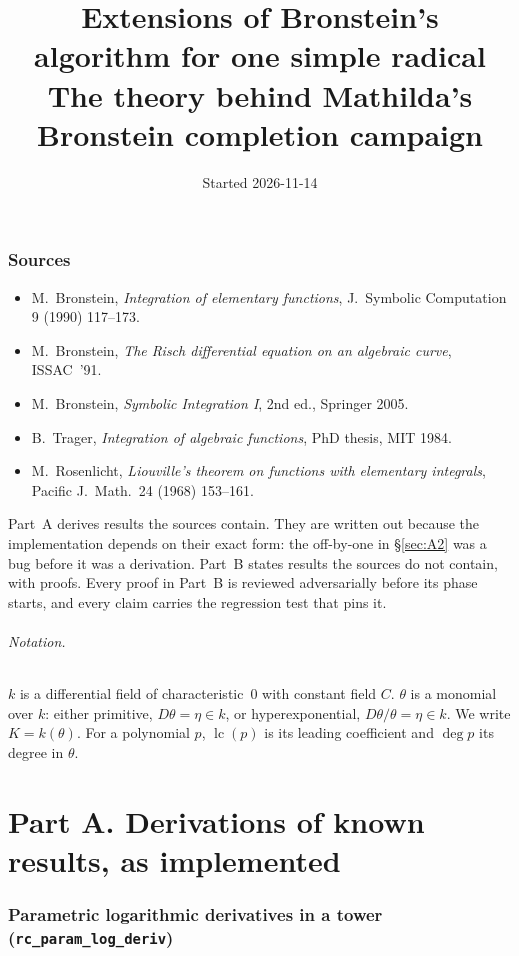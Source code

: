 \documentclass[11pt]{article}
\title{Extensions of Bronstein's algorithm for one simple radical\\
\large The theory behind Mathilda's Bronstein completion campaign}
\date{Started 2026-11-14}
\theoremstyle{definition}
\theoremstyle{remark}
\newcommand{\lc}{\operatorname{lc}}
\newcommand{\code}[1]{\texttt{#1}}
\begin{document}
\maketitle

\section*{Sources}
\begin{itemize}
\item[{[B]}] M.~Bronstein, \emph{Integration of elementary functions}, J.~Symbolic
  Computation 9 (1990) 117--173.
\item[{[B91]}] M.~Bronstein, \emph{The Risch differential equation on an algebraic
  curve}, ISSAC~'91.
\item[{[SI]}] M.~Bronstein, \emph{Symbolic Integration I}, 2nd ed., Springer 2005.
\item[{[T]}] B.~Trager, \emph{Integration of algebraic functions}, PhD thesis, MIT 1984.
\item[{[R]}] M.~Rosenlicht, \emph{Liouville's theorem on functions with elementary
  integrals}, Pacific J.~Math.\ 24 (1968) 153--161.
\end{itemize}

Part~A derives results the sources contain. They are written out because the
implementation depends on their exact form: the off-by-one in
\S\ref{sec:A2} was a bug before it was a derivation. Part~B states results the
sources do not contain, with proofs. Every proof in Part~B is reviewed
adversarially before its phase starts, and every claim carries the regression
test that pins it.

\paragraph{Notation.} $k$ is a differential field of characteristic~0 with
constant field $C$. $\theta$ is a monomial over $k$: either primitive,
$D\theta=\eta\in k$, or hyperexponential, $D\theta/\theta=\eta\in k$. We write
$K=k(\theta)$. For a polynomial $p$, $\lc(p)$ is its leading coefficient and
$\deg p$ its degree in $\theta$.

\part*{Part A. Derivations of known results, as implemented}

\section{Parametric logarithmic derivatives in a tower (\code{rc\_param\_log\_deriv})}
\label{sec:A1}
\end{document}
